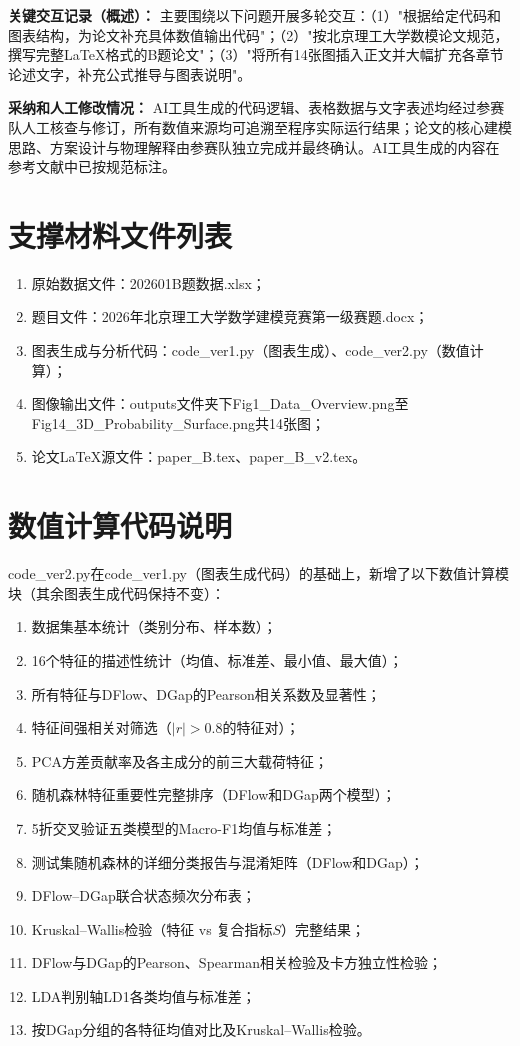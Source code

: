 \documentclass[UTF8,a4paper,12pt]{ctexart}
\begin{document}
\noindent\textbf{关键交互记录（概述）：}
主要围绕以下问题开展多轮交互：（1）"根据给定代码和图表结构，为论文补充具体数值输出代码"；（2）"按北京理工大学数模论文规范，撰写完整LaTeX格式的B题论文"；（3）"将所有14张图插入正文并大幅扩充各章节论述文字，补充公式推导与图表说明"。

\noindent\textbf{采纳和人工修改情况：}
AI工具生成的代码逻辑、表格数据与文字表述均经过参赛队人工核查与修订，所有数值来源均可追溯至程序实际运行结果；论文的核心建模思路、方案设计与物理解释由参赛队独立完成并最终确认。AI工具生成的内容在参考文献中已按规范标注。

\appendix
\section{支撑材料文件列表}
\begin{enumerate}[label=(\arabic*),leftmargin=2em]
\item 原始数据文件：202601B题数据.xlsx；
\item 题目文件：2026年北京理工大学数学建模竞赛第一级赛题.docx；
\item 图表生成与分析代码：code\_ver1.py（图表生成）、code\_ver2.py（数值计算）；
\item 图像输出文件：outputs文件夹下Fig1\_Data\_Overview.png至Fig14\_3D\_Probability\_Surface.png共14张图；
\item 论文LaTeX源文件：paper\_B.tex、paper\_B\_v2.tex。
\end{enumerate}

\section{数值计算代码说明}

code\_ver2.py在code\_ver1.py（图表生成代码）的基础上，新增了以下数值计算模块（其余图表生成代码保持不变）：

\begin{enumerate}[label=(\arabic*),leftmargin=2em]
\item 数据集基本统计（类别分布、样本数）；
\item 16个特征的描述性统计（均值、标准差、最小值、最大值）；
\item 所有特征与DFlow、DGap的Pearson相关系数及显著性；
\item 特征间强相关对筛选（$|r|>0.8$的特征对）；
\item PCA方差贡献率及各主成分的前三大载荷特征；
\item 随机森林特征重要性完整排序（DFlow和DGap两个模型）；
\item 5折交叉验证五类模型的Macro-F1均值与标准差；
\item 测试集随机森林的详细分类报告与混淆矩阵（DFlow和DGap）；
\item DFlow--DGap联合状态频次分布表；
\item Kruskal--Wallis检验（特征 vs 复合指标$S$）完整结果；
\item DFlow与DGap的Pearson、Spearman相关检验及卡方独立性检验；
\item LDA判别轴LD1各类均值与标准差；
\item 按DGap分组的各特征均值对比及Kruskal--Wallis检验。
\end{enumerate}
\end{document}
